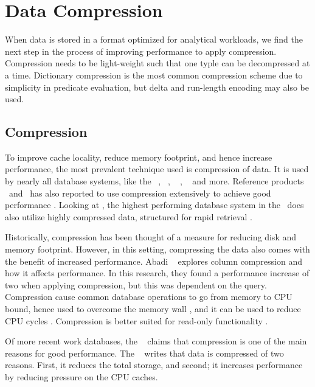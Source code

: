 \chapter{Data Compression}
\label{chap:Data Compression}
When data is stored in a format optimized for analytical workloads, we find the next step in the process of improving performance to apply compression. Compression needs to be light-weight such that one typle can be decompressed at a time. Dictionary compression is the most common compression scheme due to simplicity in predicate evaluation, but delta and run-length encoding may also be used.
\newpage

\section{Compression}
\label{sec:Compression}
To improve cache locality, reduce memory footprint, and hence increase performance, the most prevalent technique used is compression of data. It is used by nearly all database systems, like the \ibm~\cite{Raman2013-em}, \cstore~\cite{Stonebraker2005-qz}, ~ \cite{Lamb2012-kg}, \oracle~\cite{Oracle2015-fs} and more. Reference products \tableau~and \qlikview~has also reported to use compression extensively to achieve good performance \cite{Kamkolkar2015-iq, Qlik2014-vd}. Looking at \exasol, the highest performing database system in the \tpch~does also utilize highly compressed data, structured for rapid retrieval \cite{Exasol2014-xh}. 

Historically, compression has been thought of a measure for reducing disk and memory footprint. However, in this setting, compressing the data also comes with the benefit of increased performance. Abadi \ea~\cite{Abadi2008-dd} explores column compression and how it affects performance. In this research, they found a performance increase of two when applying compression, but this was dependent on the query. Compression cause common database operations to go from memory to CPU bound, hence used to overcome the memory wall \cite{Willhalm2009-hu}, and it can be used to reduce CPU cycles \cite{Stonebraker2005-qz}. Compression is better suited for read-only functionality \cite{Westmann2000-mz}.

Of more recent work databases, the \gorilla~\cite{Pelkonen2015-ko} claims that compression is one of the main reasons for good performance. The \exasol~\cite{Exasol2014-xh} writes that data is compressed of two reasons. First, it reduces the total storage, and second; it increases performance by reducing pressure on the CPU caches. 

